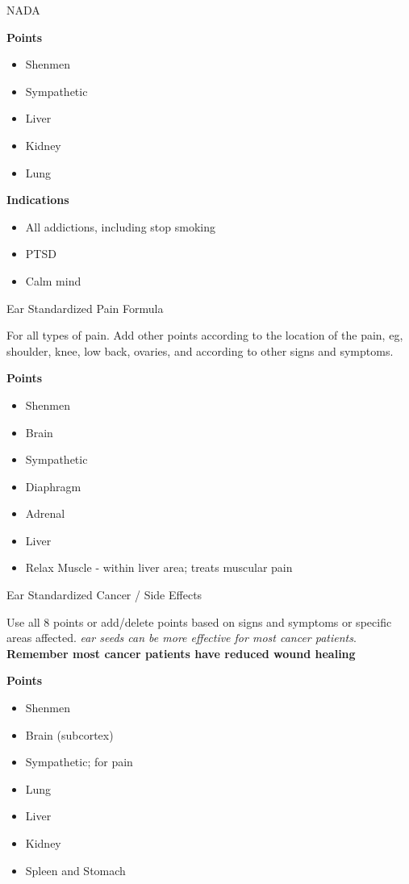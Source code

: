 \begin{frame}{NADA}

\textbf{\large Points}

\begin{itemize}
\item Shenmen
\item Sympathetic
\item Liver
\item Kidney
\item Lung
\end{itemize}

\textbf{\large Indications}
\begin{itemize}
\item All addictions, including stop smoking
\item PTSD
\item Calm mind
\end{itemize}

\end{frame}

\begin{frame}{Ear Standardized Pain Formula}

For all types of pain. Add other points according to the location of the pain, eg, shoulder, knee, low back, ovaries, and according to other signs and symptoms.

\textbf{\large Points}

\begin{itemize}
\item Shenmen
\item Brain
\item Sympathetic
\item Diaphragm
\item Adrenal
\item Liver
\item Relax Muscle - within liver area; treats muscular pain
\end{itemize}



\end{frame}

\begin{frame}{Ear Standardized Cancer / Side Effects}

Use all 8 points or add/delete points based on signs and symptoms or specific areas affected. \textit{ear seeds can be more effective for most cancer patients}. \text\bf{Remember most cancer patients have reduced wound healing}

\textbf{\large Points}

\begin{itemize}
\item Shenmen
\item Brain (subcortex)
\item Sympathetic; for pain
\item Lung
\item Liver
\item Kidney
\item Spleen and Stomach
\end{itemize}

\end{frame}

